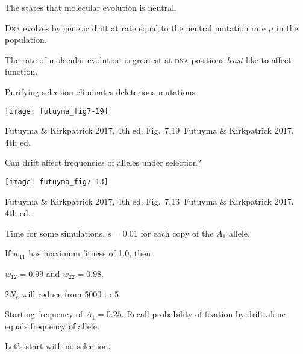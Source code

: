 \documentclass[t]{beamer}
\newcommand{\futuyma}[1]{%
	\ifthenelse{\isempty{#1}}%
	{Futuyma \& Kirkpatrick 2017, 4th ed.}%
	{Fig.~#1~Futuyma \& Kirkpatrick 2017, 4th ed.}%
}
\newcommand{\backskip}{\vspace{-0.5\baselineskip}}
\begin{document}

\begin{frame}{The  states that molecular evolution is neutral.}

\backskip

\begin{multicols}{2}
\hangpara D\textsc{na} evolves by genetic drift at  rate equal to the neutral mutation rate $\mu$ in the population.

\hangpara The rate of molecular evolution is greatest at \textsc{dna} positions \emph{least} like to affect function.

\hangpara Purifying selection eliminates deleterious mutations.

\columnbreak

\noindent \texttt{[image: futuyma\_fig7-19]}

\end{multicols}

\vfilll

\tinyfill \futuyma{7.19}

\end{frame}


\begin{frame}{Can drift affect frequencies of alleles under selection?}

\backskip

\centering

\texttt{[image: futuyma\_fig7-13]}

\vfilll

\tinyfill \futuyma{7.13}

\end{frame}


\begin{frame}{Time for some simulations.}
\hangpara $s = 0.01$ for each copy of the $A_1$ allele.

\hangpara If $w_{11}$ has maximum fitness of 1.0, then

\hangpara $w_{12} = 0.99$ and $w_{22} = 0.98.$

\hangpara $2N_e$ will reduce from 5000 to 5.

\hangpara Starting frequency of $A_1 = 0.25$. Recall probability of fixation by drift alone equals frequency of allele.

\hangpara Let's start with no selection.


\end{frame}
\end{document}
